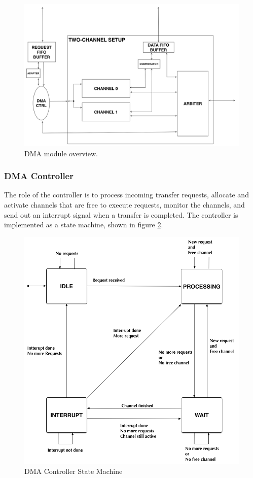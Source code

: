 \begin{figure}[htb]
    \centering
    \includegraphics[width=1\textwidth]{Figures/DMA/TopViewFinalSimple2}
    \caption{DMA module overview. }
    \label{fig:DMATopView2}
\end{figure}

\subsubsection{DMA Controller}
The role of the controller is to process incoming transfer requests, allocate and activate
channels that are free to execute requests, monitor the channels, and send out an interrupt signal
when a transfer is completed.
The controller is implemented as a state machine, shown in figure \ref{fig:DMAControllerStateMachineSimple2}.

\begin{figure}[htb]
    \centering
    \includegraphics[width=1\textwidth]{Figures/DMA/StateMachineFinalSimple}
    \caption{DMA Controller State Machine}
    \label{fig:DMAControllerStateMachineSimple2}
\end{figure}

